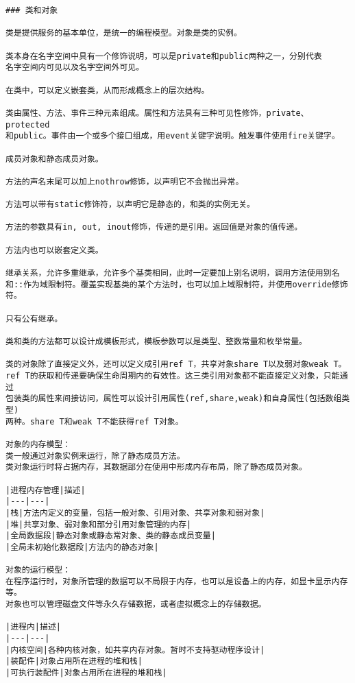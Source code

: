 \begin{lstlisting}
### 类和对象

类是提供服务的基本单位，是统一的编程模型。对象是类的实例。

类本身在名字空间中具有一个修饰说明，可以是private和public两种之一，分别代表
名字空间内可见以及名字空间外可见。

在类中，可以定义嵌套类，从而形成概念上的层次结构。

类由属性、方法、事件三种元素组成。属性和方法具有三种可见性修饰，private、protected
和public。事件由一个或多个接口组成，用event关键字说明。触发事件使用fire关键字。

成员对象和静态成员对象。

方法的声名末尾可以加上nothrow修饰，以声明它不会抛出异常。

方法可以带有static修饰符，以声明它是静态的，和类的实例无关。

方法的参数具有in, out, inout修饰，传递的是引用。返回值是对象的值传递。

方法内也可以嵌套定义类。

继承关系，允许多重继承，允许多个基类相同，此时一定要加上别名说明，调用方法使用别名
和::作为域限制符。覆盖实现基类的某个方法时，也可以加上域限制符，并使用override修饰符。

只有公有继承。

类和类的方法都可以设计成模板形式，模板参数可以是类型、整数常量和枚举常量。

类的对象除了直接定义外，还可以定义成引用ref T，共享对象share T以及弱对象weak T。
ref T的获取和传递要确保生命周期内的有效性。这三类引用对象都不能直接定义对象，只能通过
包装类的属性来间接访问，属性可以设计引用属性(ref,share,weak)和自身属性(包括数组类型)
两种。share T和weak T不能获得ref T对象。

对象的内存模型：
类一般通过对象实例来运行，除了静态成员方法。
类对象运行时将占据内存，其数据部分在使用中形成内存布局，除了静态成员对象。

|进程内存管理|描述|
|---|---|
|栈|方法内定义的变量，包括一般对象、引用对象、共享对象和弱对象|
|堆|共享对象、弱对象和部分引用对象管理的内存|
|全局数据段|静态对象或静态常对象、类的静态成员变量|
|全局未初始化数据段|方法内的静态对象|

对象的运行模型：
在程序运行时，对象所管理的数据可以不局限于内存，也可以是设备上的内存，如显卡显示内存等。
对象也可以管理磁盘文件等永久存储数据，或者虚拟概念上的存储数据。

|进程内|描述|
|---|---|
|内核空间|各种内核对象，如共享内存对象。暂时不支持驱动程序设计|
|装配件|对象占用所在进程的堆和栈|
|可执行装配件|对象占用所在进程的堆和栈|


\end{lstlisting}
